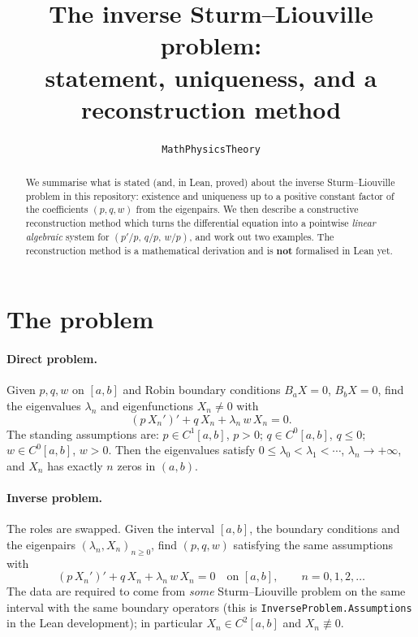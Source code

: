 \documentclass[11pt]{article}
\title{The inverse Sturm--Liouville problem:\\
statement, uniqueness, and a reconstruction method}
\author{\texttt{MathPhysicsTheory}}
\date{}
\theoremstyle{remark}
\begin{document}
\maketitle

\begin{abstract}
We summarise what is stated (and, in Lean, proved) about the inverse
Sturm--Liouville problem in this repository: existence and uniqueness up to a
positive constant factor of the coefficients $(p,q,w)$ from the eigenpairs.
We then describe a constructive reconstruction method which turns the
differential equation into a pointwise \emph{linear algebraic} system for
$(p'/p,\,q/p,\,w/p)$, and work out two examples. The reconstruction method is a
mathematical derivation and is \textbf{not} formalised in Lean yet.
\end{abstract}

\section{The problem}

\paragraph{Direct problem.}
Given $p,q,w$ on $[a,b]$ and Robin boundary conditions $B_aX=0$, $B_bX=0$,
find the eigenvalues $\lambda_n$ and eigenfunctions $X_n\neq0$ with
\[
  (p\,X_n')' + q\,X_n + \lambda_n\,w\,X_n = 0 .
\]
The standing assumptions are: $p\in C^1[a,b]$, $p>0$; $q\in C^0[a,b]$,
$q\le 0$; $w\in C^0[a,b]$, $w>0$. Then the eigenvalues satisfy
$0\le\lambda_0<\lambda_1<\cdots$, $\lambda_n\to+\infty$, and $X_n$ has
exactly $n$ zeros in $(a,b)$.

\paragraph{Inverse problem.}
The roles are swapped. Given the interval $[a,b]$, the boundary conditions and
the eigenpairs $(\lambda_n,X_n)_{n\ge0}$, find $(p,q,w)$ satisfying the same
assumptions with
\begin{equation}\label{eq:main}
  (p\,X_n')' + q\,X_n + \lambda_n\,w\,X_n = 0 \quad\text{on }[a,b],\qquad n=0,1,2,\dots
\end{equation}
The data are required to come from \emph{some} Sturm--Liouville problem on the
same interval with the same boundary operators (this is
\texttt{InverseProblem.Assumptions} in the Lean development); in particular
$X_n\in C^2[a,b]$ and $X_n\not\equiv0$.
\end{document}
